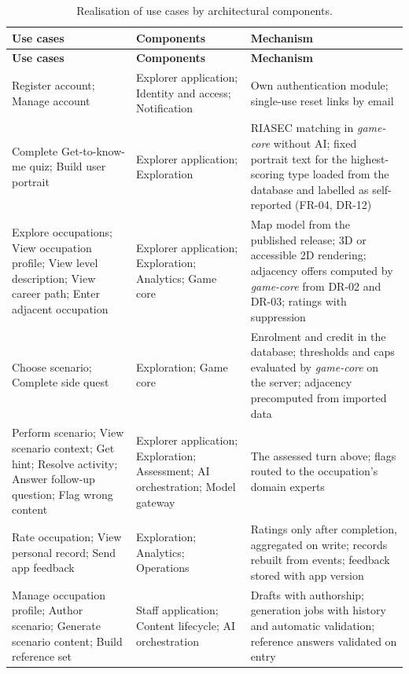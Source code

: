 {\small
\begin{longtable}{|>{\raggedright\arraybackslash}p{}|>{\raggedright\arraybackslash}p{}|>{\raggedright\arraybackslash}p{}|}
\caption{Realisation of use cases by architectural components.} \\
\hline
\textbf{Use cases} & \textbf{Components} & \textbf{Mechanism} \\ \hline
\endfirsthead
\hline
\textbf{Use cases} & \textbf{Components} & \textbf{Mechanism} \\ \hline
\endhead
Register account; Manage account & Explorer application; Identity and access; Notification & Own authentication module; single-use reset links by email \\ \hline
Complete Get-\allowbreak{}to-\allowbreak{}know-\allowbreak{}me quiz; Build user portrait & Explorer application; Exploration & RIASEC matching in \textit{game-core} without AI; fixed portrait text for the highest-\allowbreak{}scoring type loaded from the database and labelled as self-\allowbreak{}reported (FR-04, DR-12) \\ \hline
Explore occupations; View occupation profile; View level description; View career path; Enter adjacent occupation & Explorer application; Exploration; Analytics; Game core & Map model from the published release; 3D or accessible 2D rendering; adjacency offers computed by \textit{game-core} from DR-02 and DR-03; ratings with suppression \\ \hline
Choose scenario; Complete side quest & Exploration; Game core & Enrolment and credit in the database; thresholds and caps evaluated by \textit{game-core} on the server; adjacency precomputed from imported data \\ \hline
Perform scenario; View scenario context; Get hint; Resolve activity; Answer follow-up question; Flag wrong content & Explorer application; Exploration; Assessment; AI orchestration; Model gateway & The assessed turn above; flags routed to the occupation's domain experts \\ \hline
Rate occupation; View personal record; Send app feedback & Exploration; Analytics; Operations & Ratings only after completion, aggregated on write; records rebuilt from events; feedback stored with app version \\ \hline
Manage occupation profile; Author scenario; Generate scenario content; Build reference set & Staff application; Content lifecycle; AI orchestration & Drafts with authorship; generation jobs with history and automatic validation; reference answers validated on entry \\ \hline

\end{longtable}}
